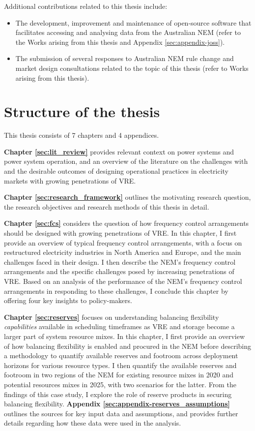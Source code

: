 \documentclass[12pt,a4paper,]{report}
\providecommand{\tightlist}{%
  \setlength{\itemsep}{0pt}\setlength{\parskip}{0pt}}
\begin{document}
Additional contributions related to this thesis include:

\begin{itemize}
\tightlist
\item
  The development, improvement and maintenance of open-source software
  that facilitates accessing and analysing data from the Australian NEM
  (refer to the Works arising from this thesis and Appendix
  \ref{sec:appendix-joss}).
\item
  The submission of several responses to Australian NEM rule change and
  market design consultations related to the topic of this thesis (refer
  to Works arising from this thesis).
\end{itemize}

\hypertarget{structure-of-the-thesis}{%
\section{Structure of the thesis}\label{structure-of-the-thesis}}

This thesis consists of 7 chapters and 4 appendices.

\textbf{Chapter \ref{sec:lit_review}} provides relevant context on power
systems and power system operation, and an overview of the literature on
the challenges with and the desirable outcomes of designing operational
practices in electricity markets with growing penetrations of VRE.

\textbf{Chapter \ref{sec:research_framework}} outlines the motivating
research question, the research objectives and research methods of this
thesis in detail.

\textbf{Chapter \ref{sec:fcs}} considers the question of how frequency
control arrangements should be designed with growing penetrations of
VRE. In this chapter, I first provide an overview of typical frequency
control arrangements, with a focus on restructured electricity
industries in North America and Europe, and the main challenges faced in
their design. I then describe the NEM's frequency control arrangements
and the specific challenges posed by increasing penetrations of VRE.
Based on an analysis of the performance of the NEM's frequency control
arrangements in responding to these challenges, I conclude this chapter
by offering four key insights to policy-makers.

\textbf{Chapter \ref{sec:reserves}} focuses on understanding balancing
flexibility \emph{capabilities} available in scheduling timeframes as
VRE and storage become a larger part of system resource mixes. In this
chapter, I first provide an overview of how balancing flexibility is
enabled and procured in the NEM before describing a methodology to
quantify available reserves and footroom across deployment horizons for
various resource types. I then quantify the available reserves and
footroom in two regions of the NEM for existing resource mixes in 2020
and potential resources mixes in 2025, with two scenarios for the
latter. From the findings of this case study, I explore the role of
reserve products in securing balancing flexibility. \textbf{Appendix
\ref{sec:appendix-reserves_assumptions}} outlines the sources for key
input data and assumptions, and provides further details regarding how
these data were used in the analysis.
\end{document}
